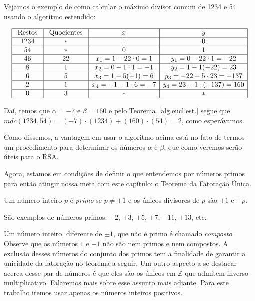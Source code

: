 Vejamos o exemplo de como calcular o m\'{a}ximo divisor comum de 1234 e 54 usando o algoritmo estendido:

\[
\begin{array}{|c|c|c|c|}\hline
\textrm{ Restos } & \textrm{ Quocientes } & x       								& y \\ \hline
				1234 	    & \ast     							& 1      									& 0 \\ \hline
				54  			& \ast     							& 0       								& 1 \\ \hline
				46        & 22   					 	  		& x_{1}=1-22\cdot 0 = 1   & y_{1}=0-22\cdot 1=-22 \\ \hline
				8     		& 1    									& x_{2}=0-1\cdot 1=-1     & y_{2}=1-1(-22)=23 \\ \hline
				6    	  	& 5    									& x_{3}=1-5(-1)=6         & y_{3}=-22-5\cdot 23=-137 \\ \hline  
				2    			& 1   									& x_{4}=-1-1\cdot 6=-7    & y_{4}=23-1\cdot(-137)=160 \\ \hline
				0   			& 3  										& \ast                    & \ast    \\ \hline
\end{array}
\]

Da\'{i}, temos que $\alpha=-7$ e $\beta=160$ e pelo Teorema~\ref{alg.eucl.est.} segue que
$mdc(1234,54)=(-7)\cdot(1234)+(160)\cdot(54)=2$, como esper\'{a}vamos.

Como dissemos, a vantagem em usar o algoritmo acima est\'{a} no fato de termos um procedimento para determinar os n\'{u}meros
$\alpha$ e $\beta$, que como veremos ser\~{a}o \'{u}teis para o RSA.

Agora, estamos em condi\c{c}\~{o}es de definir o que entendemos por n\'umeros primos para ent\~ao atingir nossa meta com este 
cap\'itulo: o Teorema da Fatora\c{c}\~ao \'Unica.

\begin{Df}
Um n\'umero inteiro $p$ \'e \textit{primo} se $p\neq \pm 1$ e os \'unicos divisores de $p$ s\~ao $\pm 1$ e $\pm p$. 
\end{Df} 

S\~ao exemplos de n\'umeros primos: $\pm 2$, $\pm 3$, $\pm 5$, $\pm 7$, $\pm 11$, $\pm 13$, etc.

Um n\'umero inteiro, diferente de $\pm 1$, que n\~ao \'e primo \'e chamado \textit{composto}. Observe que os n\'umeros $1$ e $-1$ n\~ao s\~ao nem primos e nem compostos. A exclus\~ao desses n\'umeros do conjunto dos primos tem a finalidade de garantir a unicidade da fatora\c{c}\~ao no teorema a seguir. Um outro aspecto a se destacar acerca desse par de n\'umeros \'e que eles s\~ao os \'unicos em $\mathbb{Z}$ que admitem inverso multiplicativo. Falaremos mais sobre esse assunto mais adiante. Para este trabalho iremos usar apenas os números inteiros positivos.

